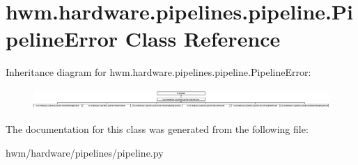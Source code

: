 \hypertarget{classhwm_1_1hardware_1_1pipelines_1_1pipeline_1_1_pipeline_error}{\section{hwm.\-hardware.\-pipelines.\-pipeline.\-Pipeline\-Error Class Reference}
\label{classhwm_1_1hardware_1_1pipelines_1_1pipeline_1_1_pipeline_error}
}
Inheritance diagram for hwm.\-hardware.\-pipelines.\-pipeline.\-Pipeline\-Error\-:\begin{figure}[H]
\begin{center}
\leavevmode
\includegraphics[height=0.782123cm]{classhwm_1_1hardware_1_1pipelines_1_1pipeline_1_1_pipeline_error}
\end{center}
\end{figure}


The documentation for this class was generated from the following file\-:\begin{DoxyCompactItemize}
\item 
hwm/hardware/pipelines/pipeline.\-py\end{DoxyCompactItemize}
